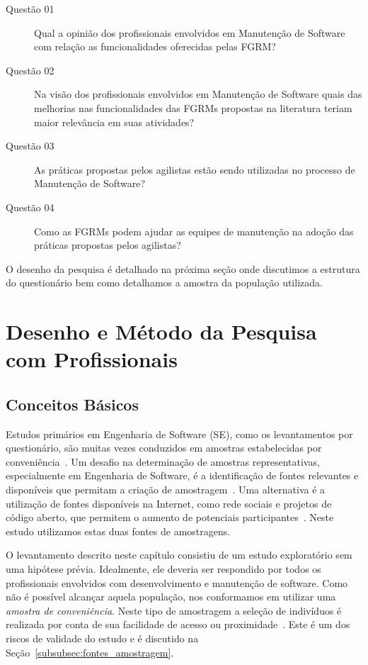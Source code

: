 \begin{description}
	\item[Questão 01] Qual a opinião dos profissionais envolvidos em Manutenção
		de Software com relação as funcionalidades oferecidas pelas
		FGRM\@?
	\item[Questão 02] Na visão dos profissionais envolvidos em Manutenção de
        Software quais das melhorias nas funcionalidades das FGRMs propostas na
        literatura teriam maior relevância em suas atividades?
	\item[Questão 03] As práticas propostas pelos agilistas estão sendo
        utilizadas no processo de Manutenção de Software?
    \item[Questão 04] Como as FGRMs podem ajudar as equipes de manutenção na
        adoção das práticas propostas pelos agilistas?
\end{description}

O desenho da pesquisa é detalhado na próxima seção onde discutimos a estrutura
do questionário bem como detalhamos a amostra da população utilizada.

\section{Desenho e Método da Pesquisa com Profissionais}
\label{sec:desenho_da_pesquisa_com_profissionais}

\subsection{Conceitos Básicos}

Estudos primários em Engenharia de Software (SE), como os levantamentos por
questionário, são muitas vezes conduzidos em amostras estabelecidas por
conveniência~\cite{sjoberg2005survey, dybaa2006systematic}. Um desafio na
determinação de amostras representativas, especialmente em Engenharia de
Software, é a identificação de fontes relevantes e disponíveis que permitam a
criação de amostragem~\cite{de2014towards}. Uma alternativa é a utilização de
fontes disponíveis na Internet, como rede sociais e projetos de código aberto,
que permitem o aumento de potenciais participantes~\cite{de2013would}. Neste
estudo utilizamos estas duas fontes de amostragens.

O levantamento descrito neste capítulo consistiu de um estudo exploratório sem
uma hipótese prévia. Idealmente, ele deveria ser respondido por todos os
profissionais envolvidos com desenvolvimento e manutenção de software. Como não
é possível alcançar aquela população, nos conformamos em utilizar uma
\textit{amostra de conveniência}. Neste tipo de amostragem a seleção de
indivíduos é realizada por conta de sua facilidade de acesso ou
proximidade~\cite{marshall1996sampling}. Este é um dos riscos de validade do
estudo e é discutido na Seção~\ref{subsubsec:fontes_amostragem}.

